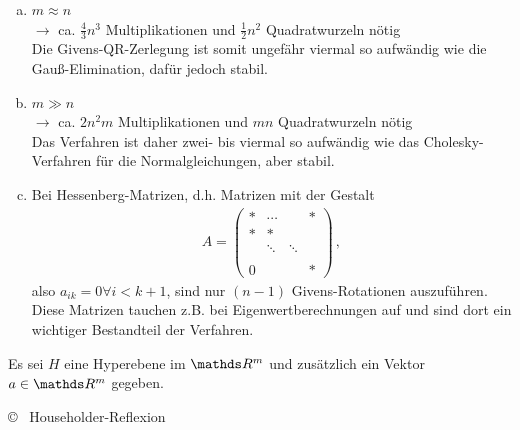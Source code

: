 \begin{enumerate}[a)]
\item $m\approx n$\\ $\longrightarrow $  ca. $\frac{4}{3}n^3$ Multiplikationen
  und $\frac{1}{2}n^2$ Quadratwurzeln nötig \\
  Die Givens-QR-Zerlegung ist somit ungefähr viermal so aufwändig
  wie die Gauß-Elimination, dafür jedoch stabil.
\item $m\gg n$\\ $\longrightarrow $ ca. $2n^2m$ Multiplikationen und 
  $mn$ Quadratwurzeln nötig \\
  Das Verfahren ist daher zwei- bis viermal so aufwändig wie das
  Cholesky-Verfahren für die Normalgleichungen, aber stabil.
\item Bei Hessenberg-Matrizen, d.h. Matrizen mit der Gestalt
  \begin{gather}
    A= \begin{pmatrix}
      * & \cdots&& * \\
      *&* \\
      &\ddots& \ddots \\
      \\
      0 &&& * 
    \end{pmatrix}
    \label{IV.4.7} \, ,
  \end{gather}
  also $a_{ik} = 0 \forall i<k+1$,
  sind nur $(n-1)$ Givens-Rotationen auszuführen.
  Diese Matrizen tauchen z.B. bei Eigenwertberechnungen auf
  und sind dort ein wichtiger Bestandteil der Verfahren.
\end{enumerate}



Es sei $H$ eine Hyperebene im $\R^m$ und zusätzlich ein Vektor
$a\in\R^m$ gegeben.

\begin{image}{\copyright~ Householder-Reflexion}
\end{image}


